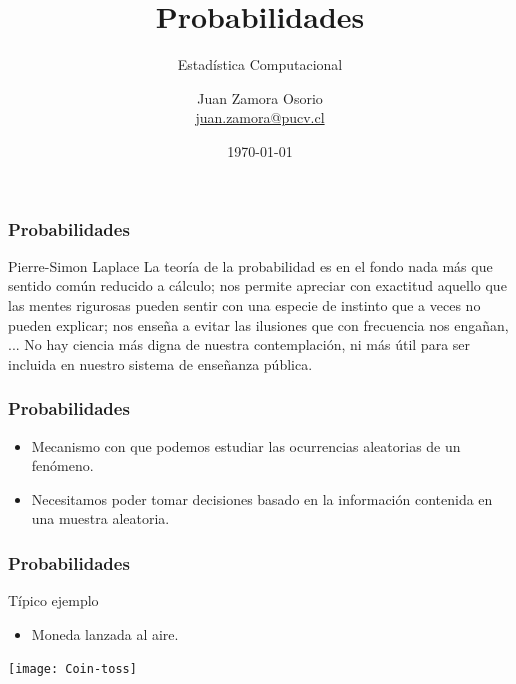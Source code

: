 \documentclass[table]{beamer}
\title{Probabilidades}
\subtitle{Estadística Computacional}
\author[J.Z.O-2023]{Juan Zamora Osorio\\\url{juan.zamora@pucv.cl}}
\institute[PUCV]{Instituto de Estadística\\Pontificia Universidad Cat\'olica de Valpara\'iso}
\date{\today}
\begin{document}
\frame{\titlepage}

\begin{frame}
    \frametitle{Probabilidades}
    \begin{block}{Pierre-Simon Laplace}
        La  teoría  de  la  probabilidad  es  en  el  fondo  nada  más  que
        sentido  común  reducido  a  cálculo;  nos  permite  apreciar  con  exactitud  aquello  que  las
        mentes rigurosas pueden sentir con una especie de instinto que a veces no pueden explicar;
        nos  enseña  a  evitar  las  ilusiones  que  con  frecuencia  nos  engañan, ...  No  hay  ciencia  más
        digna  de  nuestra  contemplación,  ni  más  útil  para  ser  incluida  en  nuestro  sistema  de
        enseñanza pública.
    \end{block}
\end{frame}

\begin{frame}
  \frametitle{Probabilidades}

     \begin{itemize}
			\item Mecanismo con que podemos estudiar las ocurrencias aleatorias de un fenómeno.
        \item Necesitamos poder tomar decisiones basado en la información contenida en una muestra aleatoria.
     \end{itemize}

\end{frame}

\begin{frame}
    \frametitle{Probabilidades}
    \begin{block}{Típico ejemplo}
        \begin{itemize}
            \item Moneda lanzada al aire.
        \end{itemize}
    \end{block}
    \begin{center}
        \texttt{[image: Coin-toss]}
    \end{center}
\end{frame}
\end{document}
